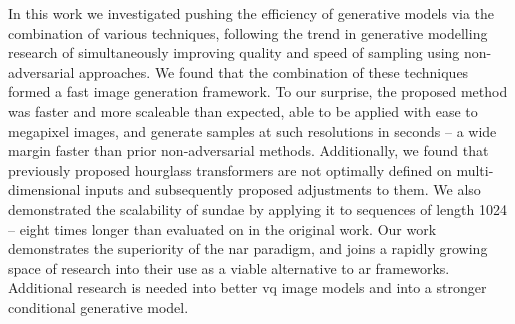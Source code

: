 In this work we investigated pushing the efficiency of generative models via the
combination of various techniques, following the trend in generative modelling
research of simultaneously improving quality and speed of sampling using
non-adversarial approaches. We found that the combination of these techniques
formed a fast image generation framework. To our surprise, the proposed method
was faster and more scaleable than expected, able to be applied with ease to
megapixel images, and generate samples at such resolutions in seconds -- a wide
margin faster than prior non-adversarial methods. Additionally, we found that
previously proposed hourglass transformers are not optimally defined on
multi-dimensional inputs and subsequently proposed adjustments to them. We also
demonstrated the scalability of \gls{sundae} by applying it to sequences of
length 1024 -- eight times longer than evaluated on in the original work. Our
work demonstrates the superiority of the \acrlong{nar} paradigm, and joins a
rapidly growing space of research into their use as a viable alternative to
\acrlong{ar} frameworks. Additional research is needed into better \gls{vq}
image models and into a stronger conditional generative model.
